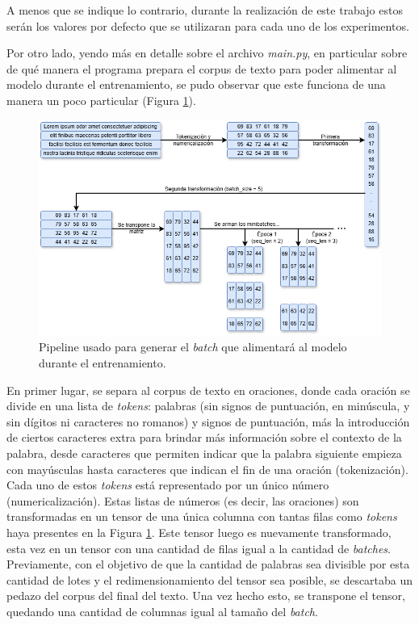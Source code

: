 A menos que se indique lo contrario, durante la realización de este trabajo estos serán los valores por defecto que se utilizaran para cada uno de los experimentos.

Por otro lado, yendo más en detalle sobre el archivo \textit{main.py}, en particular sobre de qué manera el programa prepara el corpus de texto para poder alimentar al modelo durante el entrenamiento, se pudo observar que este funciona de una manera un poco particular (Figura \ref{fig:armado_texto}).

\begin{figure}[htb]
    \centering
    \includegraphics[width=1\textwidth]{imagenes/armado_texto.png}
    \caption{Pipeline usado para generar el \textit{batch} que alimentará al modelo durante el entrenamiento.}
    \label{fig:armado_texto}
\end{figure}

En primer lugar, se separa al corpus de texto en oraciones, donde cada oración se divide en una lista de \textit{tokens}: palabras (sin signos de puntuación, en minúscula, y sin dígitos ni caracteres no romanos) y signos de puntuación, más la introducción de ciertos caracteres extra para brindar más información sobre el contexto de la palabra, desde caracteres que permiten indicar que la palabra siguiente empieza con mayúsculas hasta caracteres que indican el fin de una oración (tokenización). Cada uno de estos \textit{tokens} está representado por un único número (numericalización). Estas listas de números (es decir, las oraciones) son transformadas en un tensor de una única columna con tantas filas como \textit{tokens} haya presentes en la Figura \ref{fig:armado_texto}. Este tensor luego es nuevamente transformado, esta vez en un tensor con una cantidad de filas igual a la cantidad de \textit{batches}. Previamente, con el objetivo de que la cantidad de palabras sea divisible por esta cantidad de lotes y el redimensionamiento del tensor sea posible, se descartaba un pedazo del corpus del final del texto. Una vez hecho esto, se transpone el tensor, quedando una cantidad de columnas igual al tamaño del \textit{batch}.

